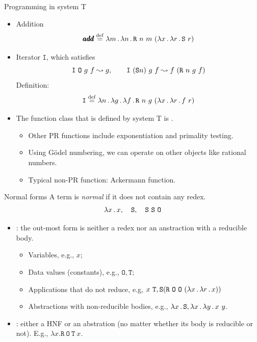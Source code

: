 \documentclass[paper=screen,mode=present,style=zysimple]{powerdot}
\begin{document}
\begin{slide}{Programming in system T}
\begin{itemize}
\item Addition
$$\pmb{add} \defeq \lambda m \ldot \lambda n \ldot 
\mathtt{R} \ n \ m \ (\lambda x \ldot \lambda r \ldot \mathtt{S} \ r)
\vspace*{-2em}
$$ 
\item Iterator $\mathtt I$, which satisfies 
$$ \mathtt I \ \mathtt{O} \ g \ f \reduce g , \qquad
\mathtt{I} \ (\mathtt{S}n) \ g \ f \reduce f \ (\mathtt{R} \ n \ g \ f)
$$ 
Definition:
$$
\mathtt I \defeq \lambda n \ldot \lambda g \ldot \lambda f \ldot \mathtt{R} \ n \ g \ (\lambda x \ldot \lambda r \ldot f \ r)
\vspace*{-2em}
$$ 
\item The function class that is defined by system T is .
\begin{itemize}
\item Other PR functions include exponentiation and primality testing.
\item Using G\"odel numbering, we can operate on other objects like rational numbers.
\item Typical non-PR function: Ackermann function.
\end{itemize}
\end{itemize}
\end{slide}

\begin{slide}{Normal forms}
A term is {\em normal} if it does not contain any redex.  
$$\lambda x \ldot x, \quad \mathtt{S}, \quad \mathtt{S\ S\ O} \vspace*{-1em}$$
\begin{itemize}
\item {}: the out-most form is neither a redex nor an anstraction 
  with a reducible body.
\begin{itemize}
\item Variables, e.g., $x$;
\item Data values (constants), e.g., $\mathtt{O}, \mathtt{T}$;
\item Applications that do not reduce, e.g, 
  $x \ \mathtt{T} ,
  \mathtt{S} (\mathtt{R} \ \mathtt{O} \ \mathtt{O} \ (\lambda x \, . \, \lambda r \, . \, x))$
\item Abstractions with non-reducible bodies, e.g., 
  $\lambda x \, . \, \mathtt{S}, \lambda x \, . \, \lambda y \, . \, x \ y$.
\end{itemize}
\item {}: either a HNF or an abstration (no matter whether its body is reducible or not). E.g., 
  $\lambda x . \mathtt{R} \ \mathtt{O} \ \mathtt{T} \ x$.
\end{itemize}
\end{slide}
\end{document}
